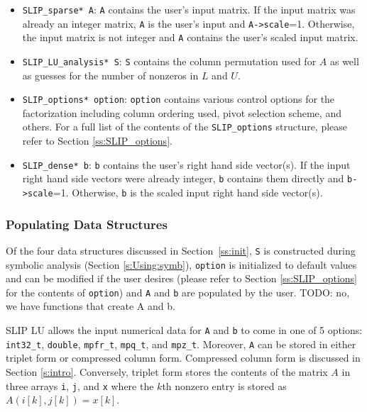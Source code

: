 \documentclass[12pt]{article}
\theoremstyle{definition}
\begin{document}
\begin{itemize}
\item \verb|SLIP_sparse* A|: \verb|A| contains the user's input matrix. If the
input matrix was already an integer matrix, \verb|A| is the user's input and
\verb|A->scale|=1. Otherwise, the input matrix is not integer and \verb|A|
contains the user's scaled input matrix.

\item \verb|SLIP_LU_analysis* S|: \verb|S| contains the column permutation used
for $A$ as well as guesses for the number of nonzeros in $L$ and $U$.

\item \verb|SLIP_options* option|: \verb|option| contains various control
options for the factorization including column ordering used, pivot selection
scheme, and others. For a full list of the contents of the \verb|SLIP_options|
structure, please refer to Section \ref{ss:SLIP_options}.

\item \verb|SLIP_dense* b|: \verb|b| contains the user's right hand side
vector(s). If the input right hand side vectors were already integer, \verb|b|
contains them directly and \verb|b->scale|=1. Otherwise, \verb|b| is the scaled
input right hand side vector(s).
\end{itemize}

\subsubsection{Populating Data Structures}

Of the four data structures discussed in Section~\ref{ss:init}, \verb|S| is
constructed during symbolic analysis (Section \ref{s:Using:symb}), \verb|option|
is initialized to default values and can be modified if the user desires
(please refer to Section \ref{ss:SLIP_options} for the contents of
\verb|option|) and \verb|A| and \verb|b| are
populated by the user.
TODO: no, we have functions that create A and b.

SLIP LU allows the input numerical data for \verb|A| and \verb|b| to come in
one of 5 options: \verb|int32_t|, \verb|double|, \verb|mpfr_t|, \verb|mpq_t|,
and \verb|mpz_t|. Moreover, \verb|A| can be stored in either triplet form or
compressed column form.  Compressed column form is discussed in Section
\ref{s:intro}. Conversely, triplet form stores the contents of the matrix $A$
in three arrays \verb|i|, \verb|j|, and \verb|x| where the $k$th nonzero entry
is stored as $A ( i[k], j[k]) = x[k]$.
\end{document}
